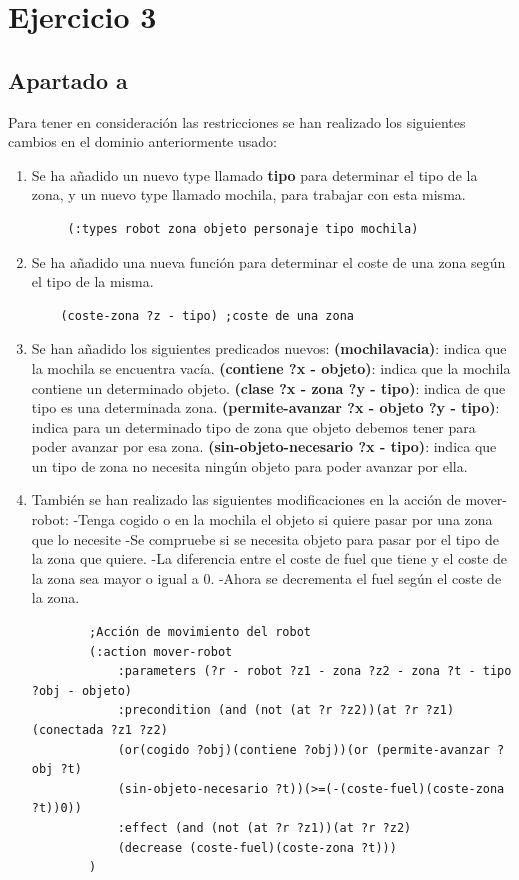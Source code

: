 \section{Ejercicio 3}
\subsection{Apartado a}
Para tener en consideración las restricciones se han realizado los siguientes cambios en el dominio anteriormente usado:
\begin{enumerate}
	\item Se ha añadido un nuevo type llamado \textbf{tipo} para determinar el tipo de la zona, y un nuevo type llamado mochila, para trabajar con esta misma.
	\begin{verbatim}
	 (:types robot zona objeto personaje tipo mochila)
	\end{verbatim}
	\item Se ha añadido una nueva función para determinar el coste de una zona según el tipo de la misma.
	\begin{verbatim}
	(coste-zona ?z - tipo) ;coste de una zona
	\end{verbatim}
	\item Se han añadido los siguientes predicados nuevos:
		\subitem \textbf{(mochilavacia)}: indica que la mochila se encuentra vacía.
		\subitem \textbf{(contiene ?x - objeto)}: indica que la mochila contiene un determinado objeto.
		\subitem \textbf{(clase ?x - zona ?y - tipo)}: indica de que tipo es una determinada zona.
		\subitem \textbf{(permite-avanzar ?x - objeto ?y - tipo)}: indica para un determinado tipo de zona que objeto debemos tener para poder avanzar por esa zona.
		\subitem \textbf{(sin-objeto-necesario ?x - tipo)}: indica que un tipo de zona no necesita ningún objeto para poder avanzar por ella.
	\item También se han realizado las siguientes modificaciones en la acción de mover-robot:
		\subitem -Tenga cogido o en la mochila el objeto si quiere pasar por una zona que lo necesite
		\subitem -Se compruebe si se necesita objeto para pasar por el tipo de la zona que quiere.
		\subitem -La diferencia entre el coste de fuel que tiene y el coste de la zona sea mayor o igual a 0.
		\subitem -Ahora se decrementa el fuel según el coste de la zona.	
		\begin{verbatim}
		;Acción de movimiento del robot
		(:action mover-robot
		    :parameters (?r - robot ?z1 - zona ?z2 - zona ?t - tipo ?obj - objeto)
		    :precondition (and (not (at ?r ?z2))(at ?r ?z1)(conectada ?z1 ?z2)
		    (or(cogido ?obj)(contiene ?obj))(or (permite-avanzar ?obj ?t)
		    (sin-objeto-necesario ?t))(>=(-(coste-fuel)(coste-zona ?t))0))
		    :effect (and (not (at ?r ?z1))(at ?r ?z2)
		    (decrease (coste-fuel)(coste-zona ?t)))
		)
		\end{verbatim}
\end{enumerate}
